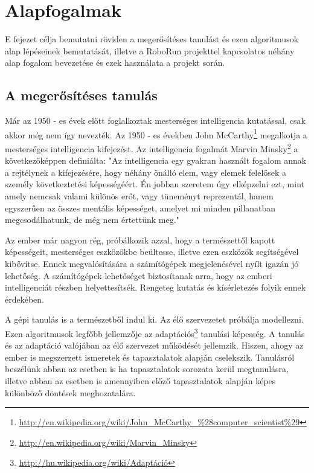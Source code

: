 \chapter{Alapfogalmak}\label{ch:ALAPFOGALMAK}

\begin{osszefoglal}
	E fejezet célja bemutatni röviden a megerősítéses tanulást és ezen algoritmusok alap lépéseinek bemutatását, illetve a RoboRun projekttel kapcsolatos néhány alap fogalom bevezetése és ezek használata a projekt során.
\end{osszefoglal}

\section{A megerősítéses tanulás}\label{sec:MEGEROSITESESTANULAS}
Már az 1950 - es évek előtt foglalkoztak mesterséges intelligencia kutatással, csak akkor még nem így nevezték. Az 1950 - es években John McCarthy\footnote{\href {http://en.wikipedia.org/wiki/Marvin_Minsky}{http://en.wikipedia.org/wiki/John\_McCarthy\_\%28computer\_scientist\%29}} megalkotja a mesterséges intelligencia kifejezést. Az intelligencia fogalmát Marvin Minsky\footnote{\href {http://en.wikipedia.org/wiki/Marvin\_Minsky}{http://en.wikipedia.org/wiki/Marvin\_Minsky}} a következőképpen definiálta: "Az intelligencia egy gyakran használt fogalom annak a rejtélynek a kifejezésére, hogy néhány önálló elem, vagy elemek felelősek a személy következtetési képességéért. Én jobban szeretem úgy elképzelni ezt, mint amely nemcsak valami különös erőt, vagy tüneményt reprezentál, hanem egyszerűen az összes mentális képességet, amelyet mi minden pillanatban megcsodálhatunk, de még nem értettünk meg." 
	
	Az ember már nagyon rég, próbálkozik azzal, hogy a természettől kapott képességeit, mesterséges eszközökbe beültesse, illetve ezen eszközök segítségével kibővítse. Ennek megvalósítására a számítógépek megjelenésével nyílt igazán jó lehetőség. A számítógépek lehetőséget biztosítanak arra, hogy az emberi intelligenciát részben helyettesítsék. Rengeteg kutatás és kísérletezés folyik ennek érdekében.	
	
	A gépi tanulás is a természetből indul ki. Az élő szervezetet próbálja modellezni. Ezen algoritmusok legfőbb jellemzője az adaptációs\footnote{\href {http://hu.wikipedia.org/wiki/Adaptáció}{http://hu.wikipedia.org/wiki/Adaptáció}} tanulási képesség. A tanulás és az adaptáció valójában az élő szervezet működését jellemzik. Hiszen, ahogy az ember is megszerzett ismeretek és tapasztalatok alapján cselekszik. Tanulásról beszélünk abban az esetben is ha tapasztalatok sorozata kerül megtanulásra, illetve abban az esetben is amennyiben előző tapasztalatok alapján képes különböző döntések meghozatalára. 
	
